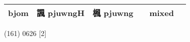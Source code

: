 \documentclass[14pt,a4paper]{scrartcl}
\begin{document}
\begin{longtable}[c]{@{}llllll@{}}
\begin{minipage}[t]{0.14\columnwidth}
bjom
\strut\end{minipage} &
\begin{minipage}[t]{0.14\columnwidth}\raggedright\strut
諷 pjuwngH
\strut\end{minipage} &
\begin{minipage}[t]{0.14\columnwidth}\raggedright\strut
楓 pjuwng
\strut\end{minipage} &
\begin{minipage}[t]{0.14\columnwidth}\raggedright\strut
\strut\end{minipage} &
\begin{minipage}[t]{0.14\columnwidth}\raggedright\strut
mixed
\strut\end{minipage}\tabularnewline
\bottomrule
\end{longtable}

(161) 0626 {[}2{]}
\end{document}
